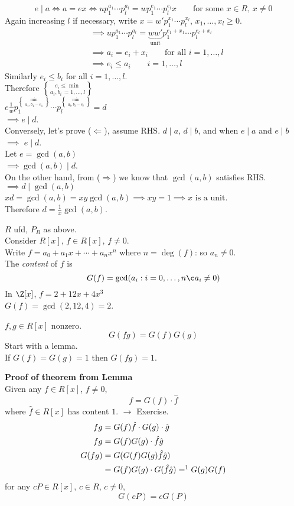 \[ e\mid a \iff a=ex \iff up_1^{a_1}\dotsm p_l^{a_l} = wp_1^{e_1}\dotsm p_l^{e_l} x \qquad\text{for some $x\in R$, $x\neq0$} \]
Again increasing $l$ if necessary, write $x=w'p_1^{x_1}\dotsm p_l^{x_l}$, $x_1,\dotsc,x_l\geq0$.
\begin{align*}
&\implies u p_1^{a_1} \dotsm p_l^{a_l} = \underbrace{ww'}_\text{unit} p_1^{e_1+x_1}\dotsm p_l^{e_l+x_l} \\
&\implies a_i = e_i + x_i \qquad \text{for all $i=1,\dotsc,l$} \\
&\implies e_i \leq a_i \qquad i=1,\dotsc,l
\end{align*}
Similarly $e_i\leq b_i$ for all $i=1,\dotsc,l$. \\
Therefore $e_i \leq \min\brace{a_i,b_i}\coloneqq 1,\dotsc,l$ \\
$e\frac{1}{w}p_1^{\min\brace{a_1,b_1}-e_1}\dotsm p_l^{\min\brace{a_l,b_l}-e_l}=d$ \\
$\implies e\mid d$. \\
Conversely, let's prove ($\Longleftarrow$), assume RHS.  $d\mid a$, $d\mid b$, and when $e\mid a$ and $e\mid b$ $\implies$ $e\mid d$. \\
Let $e=\gcd(a,b)$ \\
$\implies \gcd(a,b)\mid d$. \\
On the other hand, from ($\Longrightarrow$) we know that $\gcd(a,b)$ satisfies RHS. \\
$\implies d\mid\gcd(a,b)$ \\
$xd=\gcd(a,b)=xy\gcd(a,b) \implies xy=1 \implies \text{$x$ is a unit}$. \\
Therefore $d=\frac{1}{x}\gcd(a,b)$.

 $R$ ufd, $P_R$ as above. \\
Consider $R[x]$, $f\in R[x]$, $f\neq0$. \\
Write $f=a_0+a_1x+\dotsb+a_nx^n$ where $n=\deg(f)$: so $a_n\neq0$. \\
The \emph{content} of $f$ is
\[ G(f) = \gcd(a_i : i=0,\dotsc,n\c a_i\neq 0) \]
\ex In $\Z[x]$, $f=2+12x+4x^3$ \\
$G(f)=\gcd(2,12,4)=2$.

\thm $f,g\in R[x]$ nonzero.
\[ G(fg) = G(f)G(g) \]
Start with a lemma. \\
\lem If $G(f)=G(g)=1$ then $G(fg)=1$.

\textbf{Proof of theorem from Lemma} \\
Given any $f\in R[x]$, $f\neq0$,
\[ f = G(f) \cdot \hat f \]
where $\hat f\in R[x]$ has content $1$. $\to$ Exercise.
\begin{align*}
fg &= G(f)\hat f \cdot G(g)\cdot \hat g \\
fg &= G(f)G(g)\cdot \hat f \hat g \\
G(fg) &= G(G(f)G(g)\hat f\hat g) \\
&= G(f)G(g)\cdot G(\hat f\hat g) \mathrel{{=}\footnotemark} G(g)G(f)
\end{align*}%
\ex for any $cP\in R[x]$, $c\in R$, $c\neq0$,
\[ G(cP) = cG(P) \]
